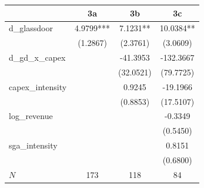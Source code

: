 \begin{table}[htbp]
\begin{tabular}{lccc}
\toprule
& 3a & 3b & 3c \\
\midrule
d\_glassdoor & 4.9799*** & 7.1231** & 10.0384** \\
 & (1.2867) & (2.3761) & (3.0609) \\
d\_gd\_x\_capex &  & -41.3953 & -132.3667 \\
 &  & (32.0521) & (79.7725) \\
capex\_intensity &  & 0.9245 & -19.1966 \\
 &  & (0.8853) & (17.5107) \\
log\_revenue &  &  & -0.3349 \\
 &  &  & (0.5450) \\
sga\_intensity &  &  & 0.8151 \\
 &  &  & (0.6800) \\
\midrule
$N$ & 173 & 118 & 84 \\
\bottomrule
\end{tabular}

\end{table}